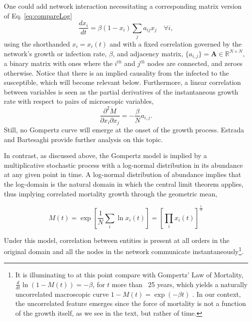 \documentclass[review]{elsarticle}
\begin{document}
One could add network interaction necessitating a corresponding matrix version of Eq. \ref{eq:compareLog}
\begin{equation}
\label{eq:networkSIR}
\frac{d x_i}{dt} = \beta (1-x_i)\sum_j{a_{ij}}x_j \quad \forall i,
\end{equation}
using the shorthanded $x_i=x_i(t)$ and with a fixed correlation governed by the network's growth or infection rate, $\beta$, and adjacency matrix, $\{a_{i,j}\}=\mathbf{A} \in \mathbb{R}^{N \times N}$, a binary matrix with ones where the $i^{th}$ and $j^{th}$ nodes are connected, and zeroes otherwise. Notice that there is an implied causality from the infected to the susceptible, which will become relevant below. Furthermore, a linear correlation between variables is seen as the partial derivatives of the instantaneous growth rate with respect to pairs of microscopic variables,
\begin{equation}
\frac{\partial^2 \dot{M}}{\partial x_i \partial x_j} = -\frac{\beta}{N} a_{i,j}.
\end{equation}
Still, no Gompertz curve will emerge at the onset of the growth process. Estrada and Bartesaghi \cite{estrada2022networked} provide further analysis on this topic.

In contrast, as discussed above, the Gompertz model is implied by a multiplicative stochastic process with a log-normal distribution in its abundance at any given point in time. A log-normal distribution of abundance implies that the log-domain is the natural domain in which the central limit theorem applies, thus implying correlated mortality growth through the geometric mean,

\begin{equation}
M(t) = \exp \left[\frac{1}{N}\sum_i \ln x_i(t)\right] = \left[\prod_i x_i (t)\right]^{\frac{1}{N}}
\end{equation} 

Under this model, correlation between entities is present at all orders in the original domain and all the nodes in the network communicate instantaneously\footnote{It is illuminating to at this point compare with Gompertz' Law of Mortality, $\frac{d}{dt}\ln{(1 - M(t))} = -\beta$, for $t$ more than ~25 years, which yields a naturally uncorrelated macroscopic curve $1 - M(t) = \exp{(-\beta t)}$ \citep{shklovskii2005simple}. 
In our context, the uncorrelated feature emerges since the force of mortality is not a function of the growth itself, as we see in the text, but rather of time.}.
\end{document}
